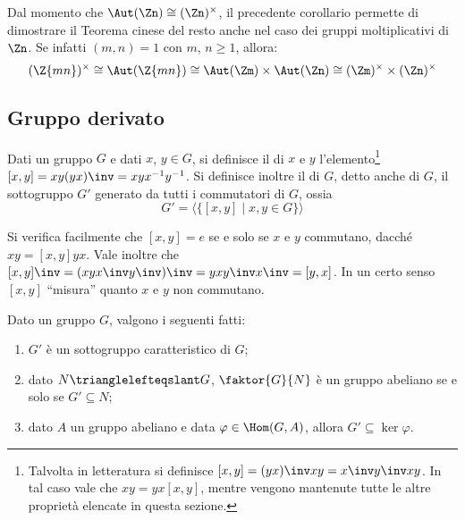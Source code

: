 \documentclass[11pt]{scrartcl}
\begin{document}
	\begin{remark}
		Dal momento che $\Aut(\Zn) \cong (\Zn)^\times$, il precedente
		corollario permette di dimostrare il Teorema cinese del resto anche
		nel caso dei gruppi moltiplicativi di $\Zn$. Se infatti $(m, n) = 1$
		con $m$, $n \geq 1$, allora:
		\[ (\Z{mn})^\times \cong \Aut(\Z{mn}) \cong \Aut(\Zm) \times \Aut(\Zn) \cong (\Zm)^\times \times (\Zn)^\times \]
	\end{remark}
	
	\newpage
	
	\subsection{Gruppo derivato}
	
	\begin{definition}
		Dati un gruppo $G$ e dati $x$, $y \in G$, si definisce il 
		di $x$ e $y$ l'elemento\footnote{
			Talvolta in letteratura si definisce $[x, y] = (yx)\inv xy = x\inv y\inv x y$. In
			tal caso vale che $xy = yx[x, y]$, mentre vengono mantenute tutte le
			altre proprietà elencate in questa sezione.
		} $[x, y] = xy(yx)\inv = xyx^{-1}y^{-1}$. Si definisce inoltre
		il  di $G$, detto anche  di $G$,
		il sottogruppo $G'$ generato da tutti i commutatori di $G$, ossia
		\[
		G' = \langle\{[x, y]\mid x, y \in G\}\rangle
		\]
	\end{definition}
	
	\begin{remark}
		Si verifica facilmente che $[x, y] = e$ se e solo se $x$ e $y$ commutano, dacché
		$xy = [x, y]yx$. Vale inoltre che $[x, y]\inv = (xyx\inv y\inv)\inv = yxy\inv x\inv =
		[y, x]$. In un certo senso $[x, y]$ ``misura'' quanto $x$ e $y$ non commutano.
	\end{remark}
	
	\begin{proposition}
		\label{prop1.35}
		Dato un gruppo $G$, valgono i seguenti fatti:
		\begin{enumerate}[(1)]
			\item $G'$ è un sottogruppo caratteristico di $G$;
			\item dato $N \trianglelefteqslant G$, $\faktor{G}{N}$ è un gruppo abeliano se
			e solo se $G' \subseteq N$;
			\item dato $A$ un gruppo abeliano e data $\varphi \in \Hom(G, A)$,
			allora $G' \subseteq \ker\varphi$.
		\end{enumerate}
	\end{proposition}
	
\end{document}
